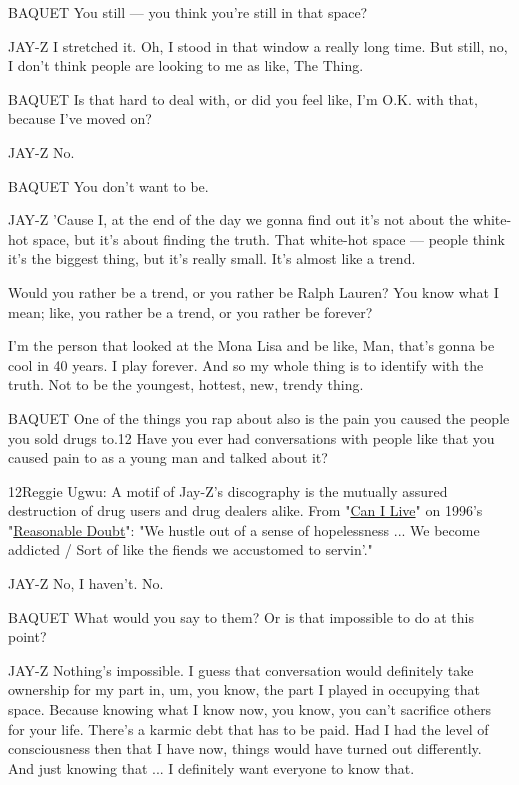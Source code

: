 BAQUET You still --- you think you're still in that space?

JAY-Z I stretched it. Oh, I stood in that window a really long time. But
still, no, I don't think people are looking to me as like, The Thing.

BAQUET Is that hard to deal with, or did you feel like, I'm O.K. with
that, because I've moved on?

JAY-Z No.

BAQUET You don't want to be.

JAY-Z 'Cause I, at the end of the day we gonna find out it's not about
the white-hot space, but it's about finding the truth. That white-hot
space --- people think it's the biggest thing, but it's really small.
It's almost like a trend.

Would you rather be a trend, or you rather be Ralph Lauren? You know
what I mean; like, you rather be a trend, or you rather be forever?

I'm the person that looked at the Mona Lisa and be like, Man, that's
gonna be cool in 40 years. I play forever. And so my whole thing is to
identify with the truth. Not to be the youngest, hottest, new, trendy
thing.

BAQUET One of the things you rap about also is the pain you caused the
people you sold drugs to.12 Have you ever had conversations with people
like that you caused pain to as a young man and talked about it?

12Reggie Ugwu: A motif of Jay-Z's discography is the mutually assured
destruction of drug users and drug dealers alike. From
"\href{https://open.spotify.com/track/0qSfuaTaSacJfsNqXZPbkX}{Can I
Live}" on 1996's
"\href{https://open.spotify.com/album/5lheTytGmdGaGlxzXu4uDY}{Reasonable
Doubt}": "We hustle out of a sense of hopelessness ... We become
addicted / Sort of like the fiends we accustomed to servin'."

JAY-Z No, I haven't. No.

BAQUET What would you say to them? Or is that impossible to do at this
point?

JAY-Z Nothing's impossible. I guess that conversation would definitely
take ownership for my part in, um, you know, the part I played in
occupying that space. Because knowing what I know now, you know, you
can't sacrifice others for your life. There's a karmic debt that has to
be paid. Had I had the level of consciousness then that I have now,
things would have turned out differently. And just knowing that ... I
definitely want everyone to know that.

